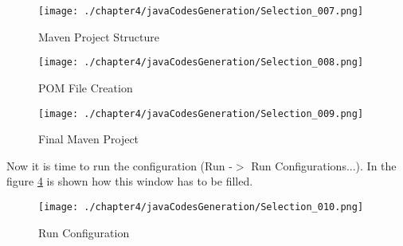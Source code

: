\begin{figure}
\centering
{\texttt{[image: ./chapter4/javaCodesGeneration/Selection\_007.png]}}
\caption{Maven Project Structure}
\label{fig:Maven Project Structure}
\end{figure}

\begin{figure}
\centering
{\texttt{[image: ./chapter4/javaCodesGeneration/Selection\_008.png]}}
\caption{POM File Creation}
\label{fig:POM File Creation}
\end{figure}

\begin{figure}
\centering
{\texttt{[image: ./chapter4/javaCodesGeneration/Selection\_009.png]}}
\caption{Final Maven Project}
\label{fig:Final Maven Project}
\end{figure}

Now it is time to run the configuration (Run -$>$ Run Configurations...). In the figure \ref{fig:Run Configuration} is shown how this window has to be filled.

\begin{figure}
\centering
{\texttt{[image: ./chapter4/javaCodesGeneration/Selection\_010.png]}}
\caption{Run Configuration}
\label{fig:Run Configuration}
\end{figure}
